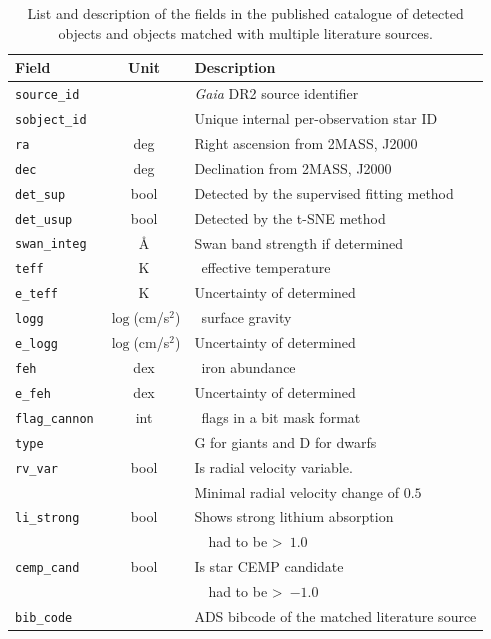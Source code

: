 \begin{table}
	\centering
	\caption{List and description of the fields in the published catalogue of detected objects and objects matched with multiple literature sources.}
	\label{tab:out_table}
	\begin{tabular}{l c l}
		\hline
		Field & Unit & Description \\ 
		\hline \hline
		\texttt{source\_id} & & {\it Gaia} DR2 source identifier \\
		\texttt{sobject\_id} & & Unique internal per-observation star ID \\
		\texttt{ra} & deg & Right ascension from 2MASS, J2000 \\
		\texttt{dec} & deg & Declination from 2MASS, J2000 \\
		\texttt{det\_sup} & bool & Detected by the supervised fitting method \\
		\texttt{det\_usup} & bool & Detected by the t-SNE method \\
		\texttt{swan\_integ} & \AA & Swan band strength if determined \\
		\texttt{teff} & K & \TC\ effective temperature \Teff \\
		\texttt{e\_teff} & K & Uncertainty of determined \Teff \\
		\texttt{logg} & $\log$(cm/s$^{2}$) & \TC\ surface gravity \Logg \\
		\texttt{e\_logg} & $\log$(cm/s$^{2}$) & Uncertainty of determined \Logg \\
		\texttt{feh} & dex & \TC\ iron abundance \Feh \\
		\texttt{e\_feh} & dex & Uncertainty of determined \Feh \\
		\texttt{flag\_cannon} & int & \TC\ flags in a bit mask format \\
		\texttt{type} & & G for giants and D for dwarfs \\
		\texttt{rv\_var} & bool & Is radial velocity variable. \\
		 & & Minimal radial velocity change of $0.5$~\kms \\
		\texttt{li\_strong} & bool & Shows strong lithium absorption \\
		 & & \TC\ \Life\ had to be >~$1.0$ \\
		\texttt{cemp\_cand} & bool & Is star CEMP candidate \\
		 & & \TC\ \Feh\ had to be >~$-1.0$ \\
		\texttt{bib\_code} &  & ADS bibcode of the matched literature source \\
		\hline
	\end{tabular}
\end{table}

